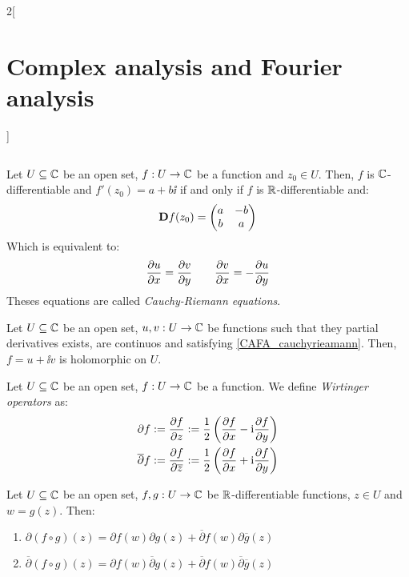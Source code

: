 \documentclass[../../../main.tex]{subfiles}
\begin{document}
\begin{multicols}{2}[\section{Complex analysis and Fourier analysis}]
\begin{proposition}
$$    $$
  \end{proposition}
  \begin{theorem}
    Let $U\subseteq \mathbb{C}$ be an open set,  $f:U\rightarrow \mathbb{C}$ be a function and $z_0\in U$. Then, $f$ is $\mathbb{C}$-differentiable and $f'(z_0)=a+b\ii$ if and only if $f$ is $\mathbb{R}$-differentiable and:
    $$\boldsymbol{\mathrm{D}}f(z_0)=
      \begin{pmatrix}
        a & -b \\
        b & a
      \end{pmatrix}$$
    Which is equivalent to:
    \begin{equation}\label{CAFA_cauchyrieamann}
      \pdv{u}{x}(z_0)=\pdv{v}{y}(z_0)\qquad\pdv{v}{x}(z_0)=-\pdv{u}{y}(z_0)
    \end{equation}
    Theses equations are called \emph{Cauchy-Riemann equations}.
  \end{theorem}
  \begin{corollary}
    Let $U\subseteq \mathbb{C}$ be an open set, $u,v:U\rightarrow\mathbb{C}$ be functions such that they partial derivatives exists, are continuos and satisfying \cref{CAFA_cauchyrieamann}. Then, $f=u+\ii v$ is holomorphic on $U$.
  \end{corollary}
  \begin{definition}
    Let $U\subseteq \mathbb{C}$ be an open set, $f:U\rightarrow \mathbb{C}$ be a function. We define \emph{Wirtinger operators} as:
    \begin{align*}
      \partial f:=\pdv{f}{z}                       & :=\frac{1}{2}\left(\pdv{f}{x}-\mathrm{i}\pdv{f}{y}\right) \\
      \overline{\partial} f:=\pdv{f}{\overline{z}} & :=\frac{1}{2}\left(\pdv{f}{x}+\mathrm{i}\pdv{f}{y}\right)
    \end{align*}
  \end{definition}
  \begin{proposition}
    Let $U\subseteq \mathbb{C}$ be an open set, $f,g:U\rightarrow \mathbb{C}$ be $\mathbb{R}$-differentiable functions, $z\in U$ and $w=g(z)$. Then:
    \begin{enumerate}
      \item $\partial(f\circ g)(z)=\partial f(w)\partial g(z)+\overline{\partial}f(w)\partial \overline{g}(z)$
      \item $\overline{\partial}(f\circ g)(z)=\partial f(w)\overline{\partial} g(z)+\overline{\partial}f(w)\overline{\partial} \overline{g}(z)$
    \end{enumerate}
  \end{proposition}
  \begin{proposition}

\end{proposition}
\end{multicols}
\end{document}
